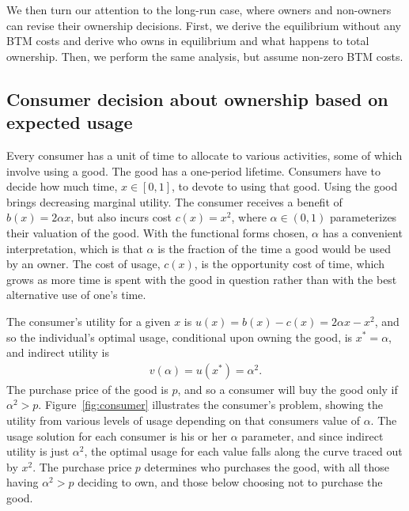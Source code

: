 \documentclass[11pt]{article}
\begin{document}
We then turn our attention to the long-run case, where owners and non-owners can revise their ownership decisions.
First, we derive the equilibrium without any BTM costs and derive who owns in equilibrium and what happens to total ownership.
Then, we perform the same analysis, but assume non-zero BTM costs. 

\subsection{Consumer decision about ownership based on expected usage}  
Every consumer has a unit of time to allocate to various activities, some of which involve using a good.  
The good has a one-period lifetime. 
Consumers have to decide how much time, $x \in [0,1]$, to devote to using that good.
Using the good brings decreasing marginal utility. 
The consumer receives a benefit of $b(x) = 2\alpha x$, but also incurs cost $c(x) = x^2$,  
where $\alpha \in (0,1)$ parameterizes their valuation of the good.
With the functional forms chosen, $\alpha$ has a convenient interpretation, which is that $\alpha$ is the fraction of the time a good would be used by an owner. 
The cost of usage, $c(x)$, is the opportunity cost of time, which grows as more time is spent with the good in question rather than with the best alternative use of one's time.

The consumer's utility for a given $x$ is $u(x) = b(x) - c(x) = 2 \alpha x - x^2$, and so the individual's optimal usage, conditional upon owning the good, is $x^* = \alpha$, and indirect utility is 
\begin{align}
v(\alpha) = u(x^*) = \alpha^2.  
\end{align} 
The purchase price of the good is $p$, and so a consumer will buy the good only if $\alpha^2 > p$. 
Figure~\ref{fig:consumer} illustrates the consumer's problem, showing the utility from various levels of usage depending on that consumers value of $\alpha$.
The usage solution for each consumer is his or her $\alpha$ parameter, and since indirect utility is just $\alpha^2$, the optimal usage for each value falls along the curve traced out by $x^2$.
The purchase price $p$ determines who purchases the good, with all those having $\alpha^2 > p$ deciding to own, and those below choosing not to purchase the good. 

\pgfmathsetmacro{\xstarOne}{\alphaOne}%
%

\pgfmathsetmacro{\xstarTwo}{\alphaTwo}%
%
\end{document}
